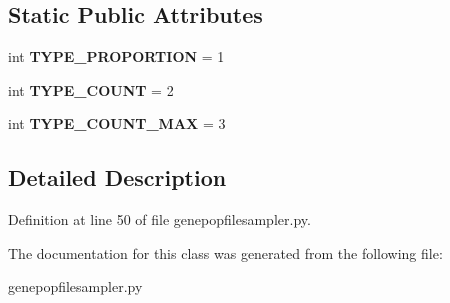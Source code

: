 \subsection*{Static Public Attributes}
\begin{DoxyCompactItemize}
\item 
int {\bfseries T\+Y\+P\+E\+\_\+\+P\+R\+O\+P\+O\+R\+T\+I\+ON} = 1\hypertarget{classnegui_1_1genepopfilesampler_1_1CohortSamplingValue_affb9d58546e344365b701094e5d3b90f}{}\label{classnegui_1_1genepopfilesampler_1_1CohortSamplingValue_affb9d58546e344365b701094e5d3b90f}

\item 
int {\bfseries T\+Y\+P\+E\+\_\+\+C\+O\+U\+NT} = 2\hypertarget{classnegui_1_1genepopfilesampler_1_1CohortSamplingValue_a0e8231d4ff71b6ffff31eaa0b2d380a1}{}\label{classnegui_1_1genepopfilesampler_1_1CohortSamplingValue_a0e8231d4ff71b6ffff31eaa0b2d380a1}

\item 
int {\bfseries T\+Y\+P\+E\+\_\+\+C\+O\+U\+N\+T\+\_\+\+M\+AX} = 3\hypertarget{classnegui_1_1genepopfilesampler_1_1CohortSamplingValue_a925f70595b847f5908ea731ccc9a0a16}{}\label{classnegui_1_1genepopfilesampler_1_1CohortSamplingValue_a925f70595b847f5908ea731ccc9a0a16}

\end{DoxyCompactItemize}


\subsection{Detailed Description}


Definition at line 50 of file genepopfilesampler.\+py.



The documentation for this class was generated from the following file\+:\begin{DoxyCompactItemize}
\item 
genepopfilesampler.\+py\end{DoxyCompactItemize}
